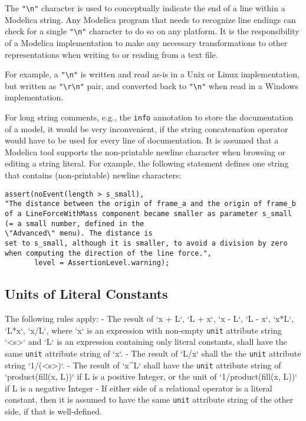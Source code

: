 The \lstinline!"\n"! character is used to conceptually indicate the
end of a line within a Modelica string. Any Modelica program that needs
to recognize line endings can check for a single \lstinline!"\n"!
character to do so on any platform. It is the responsibility of a
Modelica implementation to make any necessary transformations to other
representations when writing to or reading from a text file.

\begin{nonnormative}
For example, a \lstinline!"\n"! is written and read as-is in a Unix or Linux implementation, but written as
\lstinline!"\r\n"! pair, and converted back to \lstinline!"\n"! when read in a Windows implementation.
\end{nonnormative}

\begin{nonnormative}
For long string comments, e.g., the \lstinline!info! annotation to
store the documentation of a model, it would be very inconvenient, if
the string concatenation operator would have to be used for every line
of documentation. It is assumed that a Modelica tool supports the
non-printable newline character when browsing or editing a string
literal. For example, the following statement defines one string that
contains (non-printable) newline characters:
\begin{lstlisting}[language=modelica]
assert(noEvent(length > s_small),
"The distance between the origin of frame_a and the origin of frame_b
of a LineForceWithMass component became smaller as parameter s_small
(= a small number, defined in the
\"Advanced\" menu). The distance is
set to s_small, although it is smaller, to avoid a division by zero
when computing the direction of the line force.",
       level = AssertionLevel.warning);
\end{lstlisting}
\end{nonnormative}

\subsection{Units of Literal Constants}\label{units-literal-constants}

The following rules apply:
- The result of `x + L`, `L + x`, `x - L`, `L - x`, `x*L`, `L*x`, `x/L`, where `x` is an expression with non-empty \lstinline!unit! attribute string `<s>` and `L` is an expression containing only literal constants, shall have the same \lstinline!unit! attribute string of `x`.
- The result of `L/x` shall the the \lstinline!unit! attribute string `1/(<s>)`.
- The result of `x^L` shall have the \lstinline!unit! attribute string of `product(fill(x, L))` if L is a positive Integer, or the unit of `1/product(fill(x, L))` if L is a negative Integer
- If either side of a relational operator is a literal constant, then it is assumed to have the same \lstinline!unit! attribute string of the other side, if that is well-defined.

